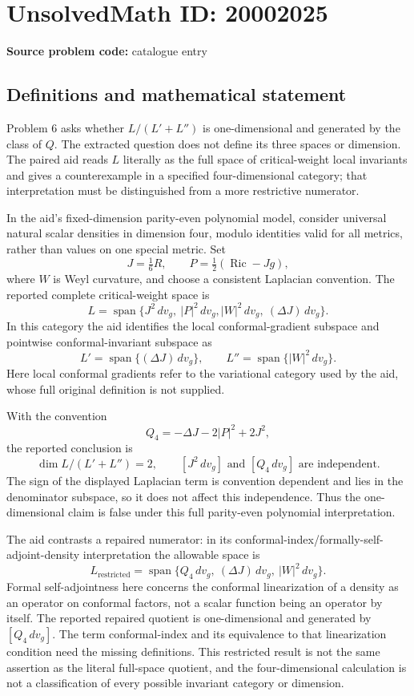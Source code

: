 \documentclass[11pt]{article}
\begin{document}
\section*{UnsolvedMath ID: 20002025}
\textbf{Source problem code:} catalogue entry
\subsection{Definitions and mathematical statement}
Problem 6 asks whether \(L/(L'+L'')\) is one-dimensional and generated by the class of \(Q\). The extracted question does not define its three spaces or dimension. The paired aid reads \(L\) literally as the full space of critical-weight local invariants and gives a counterexample in a specified four-dimensional category; that interpretation must be distinguished from a more restrictive numerator.

In the aid's fixed-dimension parity-even polynomial model, consider universal natural scalar densities in dimension four, modulo identities valid for all metrics, rather than values on one special metric. Set
\[
 J=\tfrac16R,\qquad P=\tfrac12(\operatorname{Ric}-Jg),
\]
where \(W\) is Weyl curvature, and choose a consistent Laplacian convention. The reported complete critical-weight space is
\[
 L=\operatorname{span}\{J^2\,dv_g,\ |P|^2\,dv_g,
                           |W|^2\,dv_g,\ (\Delta J)\,dv_g\}.
\]
In this category the aid identifies the local conformal-gradient subspace and pointwise conformal-invariant subspace as
\[
 L'=\operatorname{span}\{(\Delta J)\,dv_g\},\qquad
 L''=\operatorname{span}\{|W|^2\,dv_g\}.
\]
Here local conformal gradients refer to the variational category used by the aid, whose full original definition is not supplied.

With the convention
\[
 Q_4=-\Delta J-2|P|^2+2J^2,
\]
the reported conclusion is
\[
 \dim L/(L'+L'')=2,
 \qquad [J^2\,dv_g]\text{ and }[Q_4\,dv_g]\text{ are independent}.
\]
The sign of the displayed Laplacian term is convention dependent and lies in the denominator subspace, so it does not affect this independence. Thus the one-dimensional claim is false under this full parity-even polynomial interpretation.

The aid contrasts a repaired numerator: in its conformal-index/formally-self-adjoint-density interpretation the allowable space is
\[
 L_{\mathrm{restricted}}=
 \operatorname{span}\{Q_4\,dv_g,\ (\Delta J)\,dv_g,\ |W|^2\,dv_g\}.
\]
Formal self-adjointness here concerns the conformal linearization of a density as an operator on conformal factors, not a scalar function being an operator by itself. The reported repaired quotient is one-dimensional and generated by \([Q_4\,dv_g]\). The term conformal-index and its equivalence to that linearization condition need the missing definitions. This restricted result is not the same assertion as the literal full-space quotient, and the four-dimensional calculation is not a classification of every possible invariant category or dimension.
\end{document}
